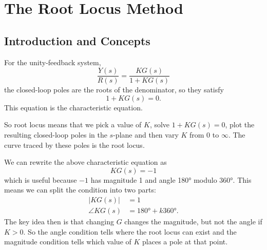 
\section{The Root Locus Method} \label{sec:rlmethod}

\subsection{Introduction and Concepts}
For the unity-feedback system,
\begin{equation*}
  \frac{Y(s)}{R(s)} = \frac{KG(s)}{1 + KG(s)}
\end{equation*}
the closed-loop poles are the roots of the denominator, so they satisfy
\begin{equation*}
  1 + KG(s) = 0
.\end{equation*}
This equation is the characteristic equation.

So root locus means that we pick a value of $K$, solve $1 + KG(s) = 0$, plot the resulting closed-loop poles in the $s$-plane and then vary $K$ from 0 to $\infty$.
The curve traced by these poles is the root locus.

We can rewrite the above characteristic equation as
\begin{equation*}
  KG(s) = -1
\end{equation*}
which is useful because $-1$ has magnitude 1 and angle \ang{180} modulo \ang{360}.
This means we can split the condition into two parts:
\begin{align*}
  \left| KG(s) \right| &= 1 \\
  \angle KG(s) &= \ang{180} + k \ang{360} 
.\end{align*}
The key idea then is that changing $G$ changes the magnitude, but not the angle if $K > 0$.
So the angle condition tells where the root locus can exist and the magnitude condition tells which value of $K$ places a pole at that point.

